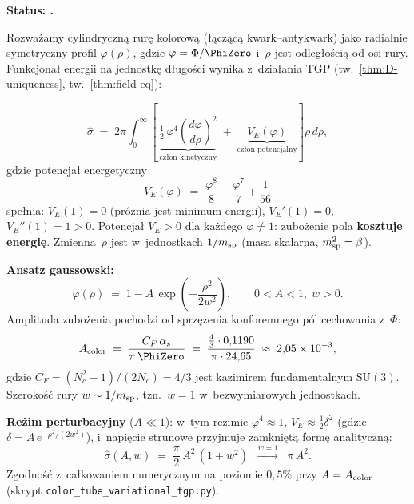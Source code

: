 \begin{proposition}%
\label{prop:X-tube-string-tension}
\textbf{Status: .}

Rozwa\.zamy cylindryczn\k{a} rur\k{e} kolorow\k{a} (\l{}\k{a}cz\k{a}c\k{a}
kwark--antykwark) jako radialnie symetryczny profil $\varphi(\rho)$,
gdzie $\varphi = \Phi/\PhiZero$ i~$\rho$ jest odleg\l{}o\'sci\k{a}
od osi rury. Funkcjona\l{} energii na jednostk\k{e} d\l{}ugo\'sci
wynika z~dzia\l{}ania TGP (tw.~\ref{thm:D-uniqueness},
tw.~\ref{thm:field-eq}):

\begin{equation}\label{eq:X-sigma-functional}
  \hat\sigma
  \;=\;
  2\pi\!\int_0^\infty\!\!
    \left[\,
      \underbrace{\tfrac{1}{2}\,\varphi^4\!\left(\frac{d\varphi}{d\rho}\right)^{\!2}}_{\text{cz\l{}on kinetyczny}}
      \;+\;
      \underbrace{V_E(\varphi)}_{\text{cz\l{}on potencjalny}}
    \right]
    \rho\,d\rho,
\end{equation}
gdzie potencja\l{} energetyczny
\begin{equation}\label{eq:X-VE-tube}
  V_E(\varphi)
  \;=\;
  \frac{\varphi^8}{8} - \frac{\varphi^7}{7} + \frac{1}{56}
\end{equation}
spe\l{}nia:
$V_E(1) = 0$
(pr\'o\.znia jest minimum energii),
$V_E'(1) = 0$,
$V_E''(1) = 1 > 0$.
Potencja\l{} $V_E > 0$ dla ka\.zdego $\varphi \ne 1$:
zubo\.zenie pola \textbf{kosztuje energi\k{e}}.
Zmienna~$\rho$ jest w~jednostkach $1/m_{\rm sp}$
(masa skalarna, $m_{\rm sp}^2 = \beta$).

\medskip\noindent
\textbf{Ansatz gaussowski:}
\begin{equation}\label{eq:X-gaussian-ansatz}
  \varphi(\rho)
  \;=\;
  1 - A\,\exp\!\left(-\frac{\rho^2}{2w^2}\right),
  \qquad
  0 < A < 1,\; w > 0.
\end{equation}
Amplituda zubo\.zenia pochodzi od sprz\k{e}\.zenia konforemnego
p\'ol cechowania z~$\Phi$:
\begin{equation}\label{eq:X-A-color}
  A_{\rm color}
  \;=\;
  \frac{C_F\,\alpha_s}{\pi\,\PhiZero}
  \;=\;
  \frac{\tfrac{4}{3}\cdot 0{,}1190}{\pi\cdot 24{,}65}
  \;\approx\; 2{,}05 \times 10^{-3},
\end{equation}
gdzie $C_F = (N_c^2-1)/(2N_c) = 4/3$ jest kazimirem
fundamentalnym $\mathrm{SU}(3)$.
Szeroko\'s\'c rury $w \sim 1/m_{\rm sp}$,
tzn.~$w = 1$ w~bezwymiarowych jednostkach.

\medskip\noindent
\textbf{Re\.zim perturbacyjny} ($A \ll 1$):
w~tym re\.zimie $\varphi^4 \approx 1$, $V_E \approx \tfrac{1}{2}\delta^2$
(gdzie $\delta = A\,e^{-\rho^2/(2w^2)}$), i~napi\k{e}cie strunowe
przyjmuje zamkni\k{e}t\k{a} form\k{e} analityczn\k{a}:
\begin{equation}\label{eq:X-sigma-perturbative}
  \boxed{
    \hat\sigma(A,w)
    \;=\;
    \frac{\pi}{2}\,A^2\,(1 + w^2)
    \;\;\xrightarrow{w=1}\;\;
    \pi\,A^2.
  }
\end{equation}
Zgodno\'s\'c z~ca\l{}kowaniem numerycznym na poziomie $0{,}5\%$
przy $A = A_{\rm color}$ (skrypt
\texttt{color\_tube\_variational\_tgp.py}).


\end{proposition}
